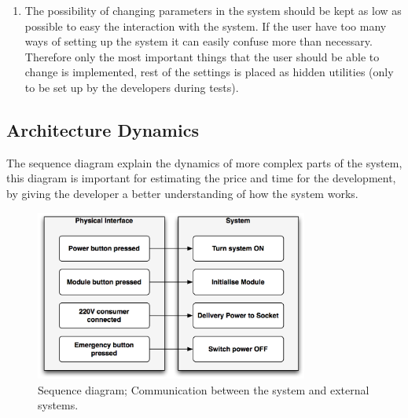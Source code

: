 \begin{enumerate}
	\item The possibility of changing parameters in the system should be kept as low as possible to easy the interaction with the system. If the user have too many ways of setting up the system it can easily confuse more than necessary. Therefore only the most important things that the user should be able to change is implemented, rest of the settings is placed as hidden utilities (only to be set up by the developers during tests). 
\end{enumerate}

\subsection{Architecture Dynamics}
The sequence diagram explain the dynamics of more complex parts of the system, this diagram is important for estimating the price and time for the development, by giving the developer a better understanding of how the system works.

\begin{figure}[H]
	\begin{centering}
		 \includegraphics[width=0.8\textwidth]{images/phy_sys.png}
		\caption{Sequence diagram; Communication between the system and external systems.}
 	\end{centering}
\end{figure}

